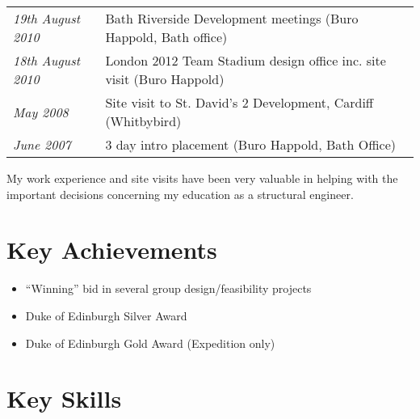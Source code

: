 \documentclass[oneside,a4paper]{article}
\begin{document}
\hspace{-6pt}\begin{tabular}{>{\it}ll}
19th August 2010 & Bath Riverside Development meetings (Buro Happold, Bath office) \\
18th August 2010	 & London 2012 Team Stadium design office inc. site visit (Buro Happold) \\
May 2008	 & Site visit to St. David's 2 Development, Cardiff (Whitbybird) \\
June 2007 & 3 day intro placement (Buro Happold, Bath Office)
\end{tabular}

My work experience and site visits have been very valuable in helping with the important decisions concerning my education as a structural engineer.

\section*{Key Achievements}

\begin{itemize}
\item ``Winning'' bid in several group design/feasibility projects
\item Duke of Edinburgh Silver Award
\item Duke of Edinburgh Gold Award (Expedition only)
\end{itemize}

\section*{Key Skills}
\end{document}
